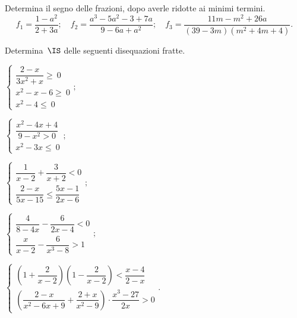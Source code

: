\begin{esercizio}
\label{ese:21.66}
Determina il segno delle frazioni, dopo averle ridotte ai minimi termini.
\[f_{1}=\dfrac{1-a^{2}}{2+3a};\quad f_{2}=\dfrac{a^{3}-5a^{2}-3+7a}{9-6a+a^{2}};\quad f_{3}=\dfrac{11m-m^{2}+26a}{(39-3m)(m^{2}+4m+4)}.\]
\end{esercizio}

\begin{esercizio}[\Ast]
\label{ese:21.67}
Determina~$\IS$ delle seguenti disequazioni fratte.

\begin{enumeratea}{\longarray
 \item $\left\{\begin{array}{l}
		\dfrac{2-x}{3x^{2}+x}\ge~0\\
		x^{2}-x-6\ge~0\\
		x^{2}-4\le~0
	\end{array}\right.;$
\item $\left\{\begin{array}{l}
        \dfrac{x^{2}-4x+4}{9-x^{2}>0}\\
        x^{2}-3x\le~0
       \end{array}\right.;$
\item $\left\{\begin{array}{l}
	   \dfrac{1}{x-2}+\dfrac{3}{x+2}<0\\
	   \dfrac{2-x}{5x-15}\le\dfrac{5x-1}{2x-6}
	   \end{array}\right.;$
\item $\left\{\begin{array}{l}
	   \dfrac{4}{8-4x}-\dfrac{6}{2x-4}<0\\
	   \dfrac{x}{x-2}-\dfrac{6}{x^{3}-8}>1
	   \end{array}\right.;$
\item $\left\{\begin{array}{l}
	   \left(1+\dfrac{2}{x-2}\right)\left(1-\dfrac{2}{x-2}\right)<\dfrac{x-4}{2-x}\\
	   \left(\dfrac{2-x}{x^{2}-6x+9}+\dfrac{2+x}{x^{2}-9}\right)\cdot{\dfrac{x^{3}-27}{2x}}>0
	   \end{array}\right..$}
\end{enumeratea}

\end{esercizio}

